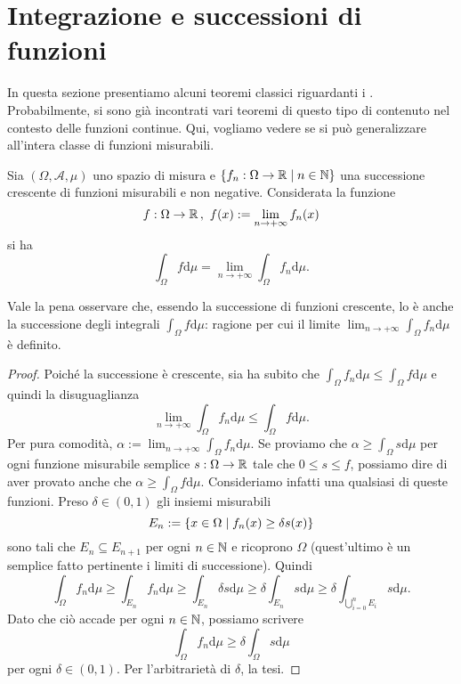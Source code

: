
\section{Integrazione e successioni di funzioni}

In questa sezione presentiamo alcuni teoremi classici riguardanti i . Probabilmente, si sono già incontrati vari teoremi di questo tipo di contenuto nel contesto delle funzioni continue. Qui, vogliamo vedere se si può generalizzare all'intera classe di funzioni misurabili.

\begin{proposizione}\label{proposizione:BeppoLevi}
Sia \((\Omega, \mathcal A, \mu)\) uno spazio di misura e \(\left\{f_n : \Omega \to \mathbb R \mid n \in \mathbb N\right\}\) una successione crescente di funzioni misurabili e non negative. Considerata la funzione
\[ f : \Omega \to \mathbb R \,, \ f(x) := \lim_{n \to +\infty} f_n(x) \]
si ha
\[\int_\Omega f \mathrm d \mu = \lim_{n \to +\infty} \int_\Omega f_n \mathrm d \mu .\]
\end{proposizione}

Vale la pena osservare che, essendo la successione di funzioni crescente, lo è anche la successione degli integrali \(\int_\Omega f \mathrm d \mu\): ragione per cui il limite \(\displaystyle\lim_{n \to +\infty} \int_\Omega f_n \mathrm d \mu\) è definito.

\begin{proof}
Poiché la successione è crescente, sia ha subito che \(\int_\Omega f_n \mathrm d \mu \le \int_\Omega f \mathrm d \mu\) e quindi la disuguaglianza
\[\lim_{n \to +\infty} \int_\Omega f_n \mathrm d \mu \le \int_\Omega f \mathrm d \mu .\]
Per pura comodità, \(\alpha := \lim_{n \to +\infty} \int_\Omega f_n \mathrm d \mu\). Se proviamo che \(\alpha \ge \int_\Omega s \mathrm d \mu\) per ogni funzione misurabile semplice \(s : \Omega \to \mathbb R\) tale che \(0 \le s \le f\), possiamo dire di aver provato anche che \(\alpha \ge \int_\Omega f \mathrm d \mu\). Consideriamo infatti una qualsiasi di queste funzioni. Preso \(\delta \in (0, 1)\) gli insiemi misurabili
\[E_n := \left\{x \in \Omega \mid f_n(x) \ge \delta s(x)\right\}\]
sono tali che \(E_n \subseteq E_{n+1}\) per ogni \(n \in \mathbb N\) e ricoprono \(\Omega\) (quest'ultimo è un semplice fatto pertinente i limiti di successione). Quindi
\[\int_\Omega f_n \mathrm d \mu \ge \int_{E_n} f_n \mathrm d \mu \ge \int_{E_n} \delta s \mathrm d \mu \ge \delta \int_{E_n} s \mathrm d \mu \ge \delta \int_{\bigcup_{i=0}^n E_i} s \mathrm d \mu .\]
Dato che ciò accade per ogni \(n \in \mathbb N\), possiamo scrivere
\[\int_\Omega f_n \mathrm d \mu \ge \delta \int_\Omega s \mathrm d \mu\]
per ogni \(\delta \in (0, 1)\). Per l'arbitrarietà di \(\delta\), la tesi.
\end{proof}

